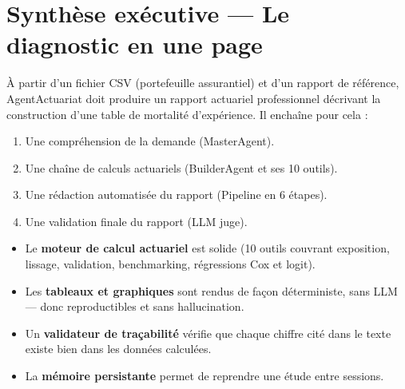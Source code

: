\documentclass[12pt,a4paper]{article}
\begin{document}
\section{Synthèse exécutive — Le diagnostic en une page}

\begin{diagbox}
À partir d'un fichier CSV (portefeuille assurantiel) et d'un rapport de référence,
AgentActuariat doit produire un rapport actuariel professionnel décrivant la
construction d'une table de mortalité d'expérience. Il enchaîne pour cela :

\begin{enumerate}[leftmargin=2em, itemsep=2pt]
  \item Une compréhension de la demande (MasterAgent).
  \item Une chaîne de calculs actuariels (BuilderAgent et ses 10 outils).
  \item Une rédaction automatisée du rapport (Pipeline en 6 étapes).
  \item Une validation finale du rapport (LLM juge).
\end{enumerate}
\end{diagbox}

\begin{forcebox}
\begin{itemize}[leftmargin=1.5em, itemsep=2pt]
  \item Le \textbf{moteur de calcul actuariel} est solide (10 outils couvrant exposition,
        lissage, validation, benchmarking, régressions Cox et logit).
  \item Les \textbf{tableaux et graphiques} sont rendus de façon déterministe, sans LLM —
        donc reproductibles et sans hallucination.
  \item Un \textbf{validateur de traçabilité} vérifie que chaque chiffre cité dans le texte
        existe bien dans les données calculées.
  \item La \textbf{mémoire persistante} permet de reprendre une étude entre sessions.
\end{itemize}
\end{forcebox}
\end{document}
